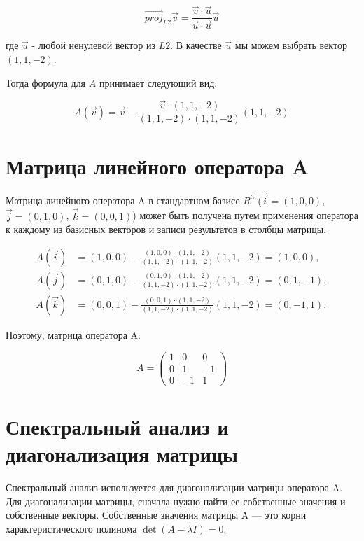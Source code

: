 \documentclass[12pt]{article}
\begin{document}
\begin{equation}
\vec{proj}_{L2}\vec{v} = \frac{\vec{v} \cdot \vec{u}}{\vec{u} \cdot \vec{u}} \vec{u}
\end{equation}

где $\vec{u}$ - любой ненулевой вектор из $L2$. В качестве $\vec{u}$ мы можем выбрать вектор $(1, 1, -2)$.

Тогда формула для $A$ принимает следующий вид:

\begin{equation}
A(\vec{v}) = \vec{v} - \frac{\vec{v} \cdot (1, 1, -2)}{(1, 1, -2) \cdot (1, 1, -2)} (1, 1, -2)
\end{equation}

\section{Матрица линейного оператора A}
Матрица линейного оператора A в стандартном базисе $R^3$ ($\vec{i} = (1, 0, 0)$, $\vec{j} = (0, 1, 0)$, $\vec{k} = (0, 0, 1)$) может быть получена путем применения оператора к каждому из базисных векторов и записи результатов в столбцы матрицы. 

\begin{align*}
A(\vec{i}) &= (1, 0, 0) - \frac{(1, 0, 0) \cdot (1, 1, -2)}{(1, 1, -2) \cdot (1, 1, -2)} (1, 1, -2) = (1, 0, 0), \\
A(\vec{j}) &= (0, 1, 0) - \frac{(0, 1, 0) \cdot (1, 1, -2)}{(1, 1, -2) \cdot (1, 1, -2)} (1, 1, -2) = (0, 1, -1), \\
A(\vec{k}) &= (0, 0, 1) - \frac{(0, 0, 1) \cdot (1, 1, -2)}{(1, 1, -2) \cdot (1, 1, -2)} (1, 1, -2) = (0, -1, 1).
\end{align*}

Поэтому, матрица оператора A:

\begin{equation}
A = \begin{pmatrix} 1 & 0 & 0 \\ 0 & 1 & -1 \\ 0 & -1 & 1 \end{pmatrix}
\end{equation}

\section{Спектральный анализ и диагонализация матрицы}
Спектральный анализ используется для диагонализации матрицы оператора A. Для диагонализации матрицы, сначала нужно найти ее собственные значения и собственные векторы. Собственные значения матрицы A — это корни характеристического полинома $\det(A - \lambda I) = 0$. 
\end{document}
